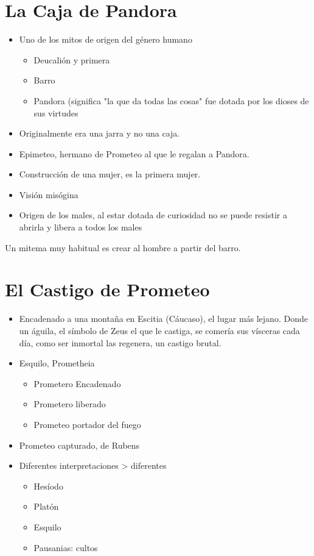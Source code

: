 \section{La Caja de Pandora}
\begin{itemize}
    \item Uno de los mitos de origen del género humano
    \begin{itemize}
        \item Deucalión y primera
        \item Barro
        \item Pandora (significa "la que da todas las cosas" fue dotada por los dioses de sus virtudes
    \end{itemize}
    \item Originalmente era una jarra y no una caja.
    \item Epimeteo, hermano de Prometeo al que le regalan a Pandora.
    \item Construcción de una mujer, es la primera mujer.
    \item Visión misógina
    \item Origen de los males, al estar dotada de curiosidad no se puede resistir a abrirla y libera a todos los males
\end{itemize}

Un mitema muy habitual es crear al hombre a partir del barro.

\section{El Castigo de Prometeo}
\begin{itemize}
    \item Encadenado a una montaña en Escitia (Cáucaso), el lugar más lejano. Donde un águila, el símbolo de Zeus el que le castiga, se comería sus vísceras cada día, como ser inmortal las regenera, un castigo brutal.
    \item Esquilo, Prometheia
    \begin{itemize}
        \item Prometero Encadenado
        \item Prometero liberado
        \item Prometeo portador del fuego
    \end{itemize}
    \item Prometeo capturado, de Rubens
    \item Diferentes interpretaciones > diferentes
    \begin{itemize}
        \item Hesíodo
        \item Platón
        \item Esquilo
        \item Pausanias: cultos
    \end{itemize}
\end{itemize}

